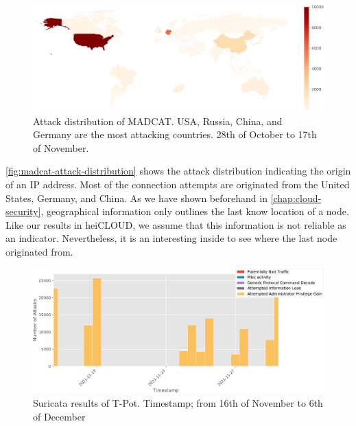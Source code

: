 \begin{figure}[ht]
    \centering
    \includegraphics[width=\textwidth]{figures/madcat-overview-map.pdf}
    \caption[Attack distribution of MADCAT]{Attack distribution of MADCAT. USA, Russia, China, and Germany are the most attacking countries. 28th of October to 17th of November.}
    \label{fig:madcat-attack-distribution}
\end{figure}

\autoref{fig:madcat-attack-distribution} shows the attack distribution indicating the origin of an IP address.
Most of the connection attempts are originated from the United States, Germany, and China.
As we have shown beforehand in \autoref{chap:cloud-security}, geographical information only outlines the last know location of a node.
Like our results in heiCLOUD, we assume that this information is not reliable as an indicator.
Nevertheless, it is an interesting inside to see where the last node originated from.

\begin{figure}[ht]
    \centering
    \includegraphics[width=\textwidth]{figures/madcat-suricata-alerts.pdf}
    \caption[Suricata results of T-Pot]{Suricata results of T-Pot. Timestamp; from 16th of November to 6th of December}
    \label{fig:suricata-distribution}
\end{figure}

